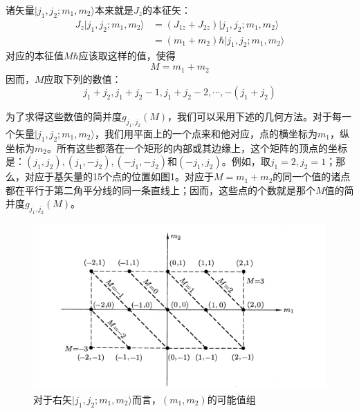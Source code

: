 \documentclass[]{article}
\begin{document}
诸矢量$|j_1,j_2;m_1,m_2\rangle$本来就是$J_z$的本征矢：
\begin{align}
	J_z|j_1,j_2;m_1,m_2\rangle&=(J_{1z}+J_{2z})|j_1,j_2;m_1,m_2\rangle\nonumber\\
	&=(m_1+m_2)\hbar|j_1,j_2;m_1,m_2\rangle
\end{align}
对应的本征值$M\hbar$应该取这样的值，使得
\begin{equation}
	M=m_1+m_2
\end{equation}
因而，$M$应取下列的数值：
\begin{equation}
	j_1+j_2,j_1+j_2-1,j_1+j_2-2,\cdots,-(j_1+j_2)
	\label{c26c26}
\end{equation}

为了求得这些数值的简并度$g_{j_1,j_2}(M)$，我们可以采用下述的几何方法。对于每一个矢量$|j_1,j_2;m_1,m_2\rangle$，我们用平面上的一个点来和他对应，点的横坐标为$m_1$，纵坐标为$m_2$。所有这些都落在一个矩形的内部或其边缘上，这个矩阵的顶点的坐标是：$(j_1,j_2),(j_1,-j_2),(-j_1,-j_2)$和$(-j_1,j_2)$。例如，取$j_1=2,j_2=1$；那么，对应于基矢量的15个点的位置如图1。对应于$M=m_1+m_2$的同一个值的诸点都在平行于第二角平分线的同一条直线上；因而，这些点的个数就是那个$M$值的简并度$g_{j_1,j_2}(M)$。\par 
\begin{figure}[H]
	\centering
	\includegraphics[scale=0.6]{1.png}
	\caption{对于右矢$|j_1,j_2;m_1,m_2\rangle$而言，$(m_1,m_2)$的可能值组}
	\label{Figure 1}
\end{figure}
\end{document}
